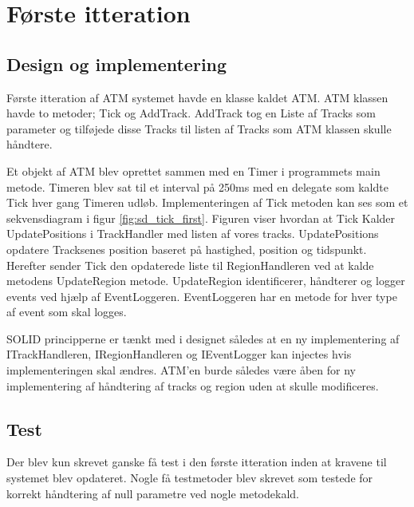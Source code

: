 \thispagestyle{fancy}
\chapter{Første itteration}
\label{chp:FirstItteration}

\section{Design og implementering}


Første itteration af ATM systemet havde en klasse kaldet ATM. ATM klassen havde to metoder; Tick og AddTrack. AddTrack tog en Liste af Tracks som parameter og tilføjede disse Tracks til listen af Tracks som ATM klassen skulle håndtere. 

Et objekt af ATM blev oprettet sammen med en Timer i programmets main metode. Timeren blev sat til et interval på 250ms med en delegate som kaldte Tick hver gang Timeren udløb. Implementeringen af Tick metoden kan ses som et sekvensdiagram i figur \ref{fig:sd_tick_first}. Figuren viser hvordan at Tick Kalder UpdatePositions i TrackHandler med listen af vores tracks. UpdatePositions opdatere Tracksenes position baseret på hastighed, position og tidspunkt. Herefter sender Tick den opdaterede liste til RegionHandleren ved at kalde metodens UpdateRegion metode. UpdateRegion identificerer, håndterer og logger events ved hjælp af EventLoggeren. EventLoggeren har en metode for hver type af event som skal logges.

SOLID principperne er tænkt med i designet således at en ny implementering af ITrackHandleren, IRegionHandleren og IEventLogger kan injectes hvis implementeringen skal ændres. ATM'en burde således være åben for ny implementering af håndtering af tracks og region uden at skulle modificeres.

\section{Test}
Der blev kun skrevet ganske få test i den første itteration inden at kravene til systemet blev opdateret. Nogle få testmetoder blev skrevet som testede for korrekt håndtering af null parametre ved nogle metodekald.


